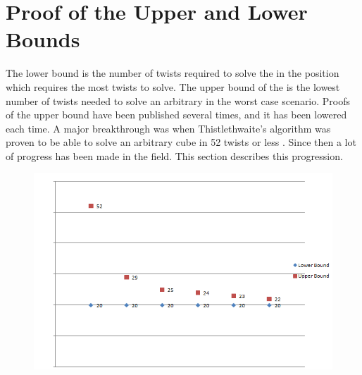 \chapter{Proof of the Upper and Lower Bounds}

The lower bound is the number of twists required to solve the \rubik{} in the position which requires the most twists to solve.
The upper bound of the \rubik{} is the lowest number of twists needed to solve an arbitrary \rubik{} in the worst case scenario.
Proofs of the upper bound have been published several times, and it has been lowered each time.
A major breakthrough was when Thistlethwaite's algorithm was proven to be able to solve an arbitrary cube in 52 twists or less \cite{jaapthistle}.
Since then a lot of progress has been made in the field.
This section describes this progression.

\begin{figure}[ht]
	\centering
		\includegraphics[scale = 0.7]{input/pics/bounds.png}
	\caption{}
	\label{fig:superflip}
\end{figure}





